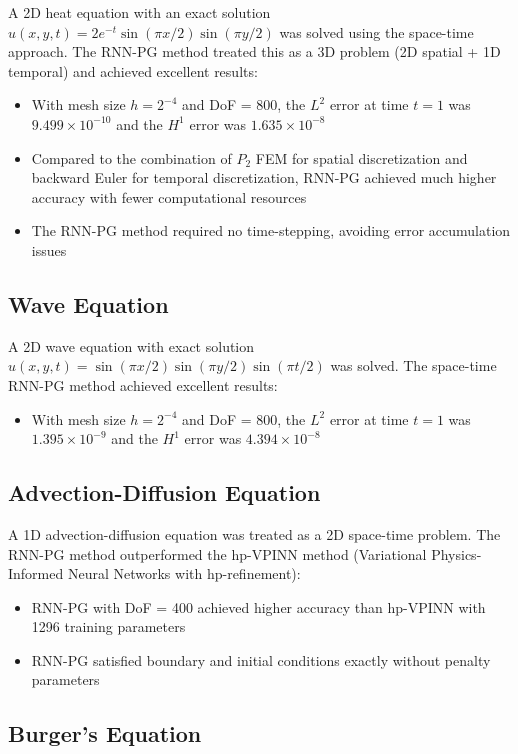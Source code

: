 \documentclass[11pt,a4paper]{article}
\begin{document}
A 2D heat equation with an exact solution $u(x,y,t) = 2e^{-t}\sin(\pi x/2)\sin(\pi y/2)$ was solved using the space-time approach. The RNN-PG method treated this as a 3D problem (2D spatial + 1D temporal) and achieved excellent results:

\begin{itemize}
    \item With mesh size $h = 2^{-4}$ and DoF = 800, the $L^2$ error at time $t = 1$ was $9.499 \times 10^{-10}$ and the $H^1$ error was $1.635 \times 10^{-8}$
    \item Compared to the combination of $P_2$ FEM for spatial discretization and backward Euler for temporal discretization, RNN-PG achieved much higher accuracy with fewer computational resources
    \item The RNN-PG method required no time-stepping, avoiding error accumulation issues
\end{itemize}

\subsection{Wave Equation}

A 2D wave equation with exact solution $u(x,y,t) = \sin(\pi x/2)\sin(\pi y/2)\sin(\pi t/2)$ was solved. The space-time RNN-PG method achieved excellent results:
\begin{itemize}
    \item With mesh size $h = 2^{-4}$ and DoF = 800, the $L^2$ error at time $t = 1$ was $1.395 \times 10^{-9}$ and the $H^1$ error was $4.394 \times 10^{-8}$
\end{itemize}

\subsection{Advection-Diffusion Equation}

A 1D advection-diffusion equation was treated as a 2D space-time problem. The RNN-PG method outperformed the hp-VPINN method (Variational Physics-Informed Neural Networks with hp-refinement):
\begin{itemize}
    \item RNN-PG with DoF = 400 achieved higher accuracy than hp-VPINN with 1296 training parameters
    \item RNN-PG satisfied boundary and initial conditions exactly without penalty parameters
\end{itemize}

\subsection{Burger's Equation}
\end{document}
